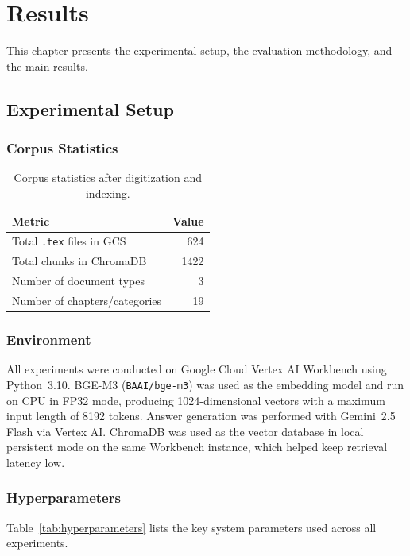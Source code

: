 \chapter{Results}
\label{chap:Results}

This chapter presents the experimental setup, the evaluation methodology,
and the main results.

\section{Experimental Setup}
\label{sec:experimental-setup}

\subsection{Corpus Statistics}

\begin{table}[H]
\centering
\caption{Corpus statistics after digitization and indexing.}
\label{tab:corpus-stats}
\begin{tabular}{lr}
\toprule
\textbf{Metric} & \textbf{Value} \\
\midrule
Total \texttt{.tex} files in GCS  & 624 \\
Total chunks in ChromaDB          & 1422 \\
Number of document types          & 3 \\
Number of chapters/categories     & 19 \\
\bottomrule
\end{tabular}
\end{table}

\subsection{Environment}
All experiments were conducted on Google Cloud Vertex AI Workbench using
Python~3.10. BGE-M3 (\texttt{BAAI/bge-m3}) was used as the embedding model
and run on CPU in FP32 mode, producing 1024-dimensional vectors with a
maximum input length of 8192 tokens. Answer generation was performed with
Gemini~2.5 Flash via Vertex AI. ChromaDB was used as the vector database in
local persistent mode on the same Workbench instance, which helped keep
retrieval latency low.

\subsection{Hyperparameters}
Table~\ref{tab:hyperparameters} lists the key system parameters used
across all experiments.

